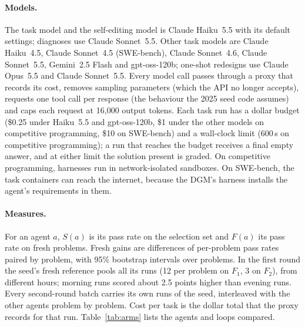 \paragraph{Models.} The task model and the self-editing model is Claude Haiku~5.5 with its default settings; diagnoses
use Claude Sonnet~5.5. Other task models are Claude Haiku~4.5, Claude Sonnet~4.5 (SWE-bench), Claude Sonnet~4.6,
Claude Sonnet~5.5, Gemini~2.5 Flash and gpt-oss-120b; one-shot redesigns use Claude Opus~5.5 and Claude Sonnet~5.5.
Every model call passes through a proxy that records its cost, removes sampling parameters (which the API no longer
accepts), requests one tool call per response (the behaviour the 2025 seed code assumes) and caps each request at
16{,}000 output tokens. Each task run has a dollar budget (\$0.25 under Haiku~5.5 and gpt-oss-120b, \$1 under the
other models on competitive programming, \$10 on SWE-bench) and a wall-clock limit (600\,s on competitive
programming); a run that reaches the budget receives a final empty answer, and at either
limit the solution present is graded. On competitive programming, harnesses run in network-isolated sandboxes. On
SWE-bench, the task containers can reach the internet, because the DGM's harness installs the agent's requirements in
them.

\paragraph{Measures.} For an agent $a$, $S(a)$ is its pass rate on the selection set and $F(a)$ its pass rate on fresh
problems. Fresh gains are differences of per-problem pass rates paired by problem, with 95\% bootstrap intervals over
problems. In the first round the seed's fresh reference pools all its runs (12 per problem on $F_1$, 3 on $F_2$), from
different hours; morning runs scored about 2.5 points higher than evening runs. Every second-round batch carries its own
runs of the seed, interleaved with the other agents problem by problem. Cost per task is the dollar total that the proxy records for that run. Table~\ref{tab:arms} lists the agents and loops compared.


